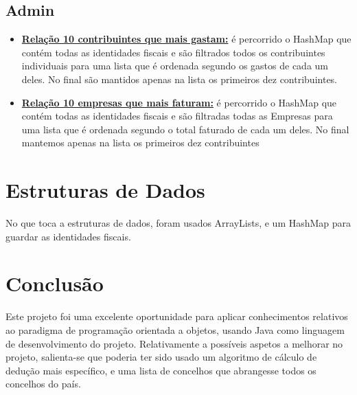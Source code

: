 \subsection{Admin}
\begin{itemize}
\item \textbf{\underline{Relação 10 contribuintes que mais gastam:}} é percorrido o HashMap que contém todas as identidades fiscais e são filtrados todos os contribuintes individuais para uma lista que é ordenada segundo os gastos de cada um deles. No final são mantidos apenas na lista os primeiros dez contribuintes.

\item \textbf{\underline{Relação 10 empresas que mais faturam:}} é percorrido o HashMap que contém todas as identidades fiscais e são filtradas todas as Empresas para uma lista que é ordenada segundo o total faturado de cada um deles. No final mantemos apenas na lista os primeiros dez contribuintes
\end{itemize}

\section{Estruturas de Dados}
No que toca a estruturas de dados, foram usados ArrayLists, e um HashMap para guardar as identidades fiscais.

\section{Conclusão}
Este projeto foi uma excelente oportunidade para aplicar conhecimentos relativos ao paradigma de programação orientada a objetos, usando Java como linguagem de desenvolvimento do projeto. Relativamente a possíveis aspetos a melhorar no projeto, salienta-se que poderia ter sido usado um algoritmo de cálculo de dedução mais específico, e uma lista de concelhos que abrangesse todos os concelhos do país.

